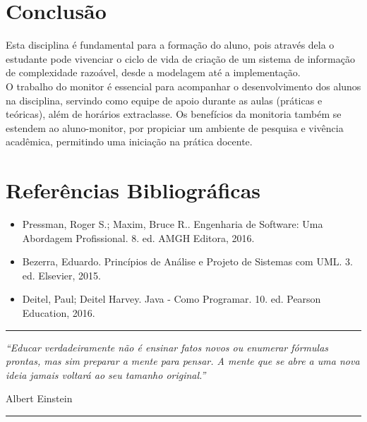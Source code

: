 \documentclass[a0, portrait, final]{a0poster}
\newcommand{\aspasleft}{\textquotedblleft}
\newcommand{\aspasright}{\textquotedblright}
\begin{document}
\begin{multicols}{3}
\section{Conclusão}
\begin{spacing}{3.0}
{\large Esta disciplina é fundamental para a formação do aluno, pois através dela o estudante pode vivenciar o ciclo de vida de criação de um sistema de informação de complexidade razoável, desde a modelagem até a implementação. 
\\ O trabalho do monitor é essencial para acompanhar o desenvolvimento dos alunos na disciplina, servindo como equipe de apoio durante as aulas (práticas e teóricas), além de horários extraclasse. Os benefícios da monitoria também se estendem ao aluno-monitor, por propiciar um ambiente de pesquisa e vivência acadêmica, permitindo uma iniciação na prática docente.
}
\end{spacing}

\section{Referências Bibliográficas}
\begin{spacing}{3.0}
\begin{itemize}
	\item {\large Pressman, Roger S.; Maxim, Bruce R.. Engenharia de Software: Uma Abordagem Profissional. 8. ed.  AMGH Editora, 2016.}
	\item {\large Bezerra, Eduardo. Princípios de Análise e Projeto de Sistemas com UML. 3. ed. Elsevier, 2015.}
	\item {\large Deitel, Paul; Deitel Harvey. Java - Como Programar. 10. ed. Pearson Education, 2016.}
\end{itemize}
\end{spacing}

\end{multicols}

\vspace{1.5cm}

\noindent \rule{\textwidth}{4pt}
\vspace{0.1cm}

\begin{center}
{\itshape \aspasleft Educar verdadeiramente não é ensinar fatos novos ou enumerar fórmulas prontas, mas sim preparar a mente para pensar. A mente que se abre a uma nova ideia jamais voltará ao seu tamanho original.\aspasright}\\
\end{center}

\begin{flushright}
{\normalsize Albert Einstein}\\
\end{flushright}

\vspace{0.1cm}

\noindent \rule{\textwidth}{6pt}
\end{document}
